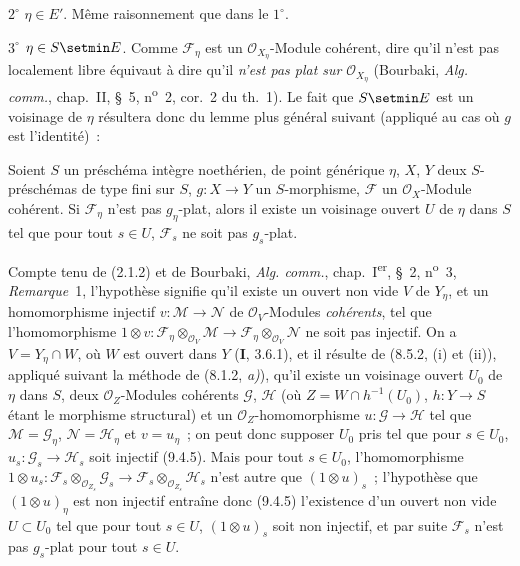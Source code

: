 $2^\circ$ $\eta\in E'$. Même raisonnement que dans le $1^\circ$.

$3^\circ$ $\eta\in S\setmin E$. Comme $\mathcal F_\eta$ est un
$\mathcal O_{X_\eta}$-Module cohérent, dire qu'il n'est pas localement libre
équivaut à dire qu'il \emph{n'est pas plat sur} $\mathcal O_{X_\eta}$
(Bourbaki, \emph{Alg. comm.}, chap.~II, \S~5, n\textsuperscript{o}~2,
cor.~2 du th.~1). Le fait que $S\setmin E$ est un voisinage de $\eta$ résultera donc
du lemme plus général suivant (appliqué au cas où $g$ est l'identité)~:

\begin{lemma}[9.4.7.1]
\label{IV.9.4.7.1-fr}
Soient $S$ un préschéma intègre noethérien, de point générique $\eta$, $X$,
$Y$ deux $S$-préschémas de type fini sur $S$, $g:X\to Y$ un $S$-morphisme,
$\mathcal F$ un $\mathcal O_X$-Module cohérent. Si $\mathcal F_\eta$ n'est
pas $g_\eta$-plat, alors il existe un voisinage ouvert $U$ de $\eta$ dans $S$
tel que pour tout $s\in U$, $\mathcal F_s$ ne soit pas $g_s$-plat.
\end{lemma}

Compte tenu de (2.1.2) et de Bourbaki, \emph{Alg. comm.}, chap.~I\textsuperscript{er},
\S~2, n\textsuperscript{o}~3, \emph{Remarque}~1, l'hypothèse signifie qu'il existe un
ouvert non vide $V$ de $Y_\eta$, et un homomorphisme injectif
$v:\mathcal M\to\mathcal N$ de $\mathcal O_V$-Modules \emph{cohérents}, tel
que l'homomorphisme
$1\otimes v:\mathcal F_\eta\otimes_{\mathcal O_V}\mathcal M\to
\mathcal F_\eta\otimes_{\mathcal O_V}\mathcal N$ ne soit pas injectif. On a
$V=Y_\eta\cap W$, où $W$ est ouvert dans $Y$ (\textbf{I}, 3.6.1), et il
résulte de (8.5.2, (i) et (ii)), appliqué suivant la méthode de
(8.1.2, \emph{a)}), qu'il existe un voisinage ouvert $U_0$ de $\eta$ dans $S$,
deux $\mathcal O_Z$-Modules
cohérents $\mathcal G$, $\mathcal H$ (où $Z=W\cap h^{-1}(U_0)$,
$h:Y\to S$ étant le morphisme structural) et un $\mathcal O_Z$-homomorphisme
$u:\mathcal G\to\mathcal H$ tel que $\mathcal M=\mathcal G_\eta$,
$\mathcal N=\mathcal H_\eta$ et $v=u_\eta$~; on peut donc supposer $U_0$ pris
tel que pour $s\in U_0$, $u_s:\mathcal G_s\to\mathcal H_s$ soit injectif
(9.4.5). Mais pour tout $s\in U_0$, l'homomorphisme
$1\otimes u_s:\mathcal F_s\otimes_{\mathcal O_{Z_s}}\mathcal G_s\to
\mathcal F_s\otimes_{\mathcal O_{Z_s}}\mathcal H_s$ n'est autre que
$(1\otimes u)_s$~; l'hypothèse que $(1\otimes u)_\eta$ est non injectif
entraîne donc (9.4.5) l'existence d'un ouvert non vide $U\subset U_0$ tel que
pour tout $s\in U$, $(1\otimes u)_s$ soit non injectif, et par suite
$\mathcal F_s$ n'est pas $g_s$-plat pour tout $s\in U$.

